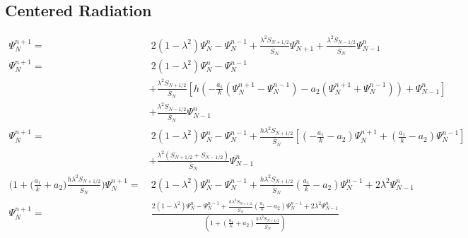 \documentclass[dvipsnames]{article}
\begin{document}
\subsection{Centered Radiation}
\label{app:centeredRad} 
\begin{align}
    \Psi_N^{n+1} = &\ 2(1-\lambda^2)\Psi_N^n-\Psi_N^{n-1}+ \frac{\lambda^2S_{N+1/2}}{\bar S_N}\Psi_{N+1}^n + \frac{\lambda^2S_{N-1/2}}{\bar S_N}\Psi_{N-1}^n\nonumber\\
    \Psi_N^{n+1} = &\ 2(1-\lambda^2)\Psi_N^n-\Psi_N^{n-1}\nonumber\\
    &+\frac{\lambda^2S_{N+1/2}}{\bar S_N}\left[h\left(-\frac{a_1}{k}(\Psi_N^{n+1} - \Psi_N^{n-1}) - a_2(\Psi_N^{n+1} + \Psi_N^{n-1})\right)+\Psi_{N-1}^n\right]\nonumber\\
    &+ \frac{\lambda^2S_{N-1/2}}{\bar S_N}\Psi_{N-1}^n\nonumber\\
    \Psi_N^{n+1} = &\ 2(1-\lambda^2)\Psi_N^n-\Psi_N^{n-1}+ \frac{h\lambda^2S_{N+1/2}}{\bar S_N}\left[\left(-\frac{a_1}{k} - a_2\right)\Psi_N^{n+1} + \left(\frac{a_1}{k}-a_2\right)\Psi_N^{n-1}\right]\nonumber\\
    &+ \frac{\lambda^2(S_{N+1/2}+S_{N-1/2})}{\bar S_N}\Psi_{N-1}^n\nonumber\\
    \!\!\!\!\!\!\!\!\!\!\!\!\!\!\!\!\!\!\!\!\!\!\!\!\!\!\!\!\!\!\!\!\!\!\!\!\!\!\!\!\!\!\!\!\bigg(1+\Big(\frac{a_1}{k}+a_2\Big)\frac{h\lambda^2S_{N+1/2}}{\bar S_N}\bigg)\Psi_N^{n+1} =&\  2(1-\lambda^2)\Psi_N^n-\Psi_N^{n-1}+\frac{h\lambda^2S_{N+1/2}}{\bar S_N}\left(\frac{a_1}{k}-a_2\right)\Psi_N^{n-1} + 2\lambda^2\Psi_{N-1}^n\nonumber\\
    \Psi_N^{n+1} = &\  \frac{2(1-\lambda^2)\Psi_N^n-\Psi_N^{n-1}+\frac{h\lambda^2S_{N+1/2}}{\bar S_N}\left(\frac{a_1}{k}-a_2\right)\Psi_N^{n-1} + 2\lambda^2\Psi_{N-1}^n}{\left(1+\left(\frac{a_1}{k}+a_2\right)\frac{h\lambda^2S_{N+1/2}}{\bar S_N}\right)}
\end{align}
\end{document}
